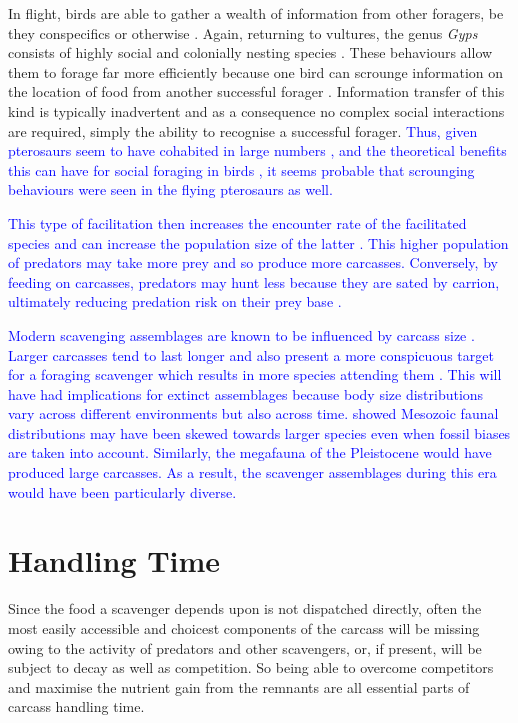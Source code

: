 \documentclass[a4paper,12pt]{article}
\begin{document}
In flight, birds are able to gather a wealth of information from other foragers, be they conspecifics or otherwise \textcolor{blue}{\citep{jackson2008effect,KaneVul,moleon2014inter}}.
Again, returning to vultures, the genus \textit{Gyps} consists of highly social and colonially nesting species \citep{fernandez2015density}.
These behaviours allow them to forage far more efficiently because one bird can scrounge information on the location of food from another successful forager \textcolor{blue}{\citep{cortes2014bird}}.
Information transfer of this kind is typically inadvertent and as a consequence no complex social interactions are required, simply the ability to recognise a successful forager.
\textcolor{blue}{Thus, given pterosaurs seem to have cohabited in large numbers \citep{witton2013pterosaurs}, and the theoretical benefits this can have for social foraging in birds \citep{jackson2011evolutionary}, it seems probable that scrounging behaviours were seen in the flying pterosaurs as well.} 

\textcolor{blue}{This type of facilitation then increases the encounter rate of the facilitated species and can increase the population size of the latter \citep{moleon2014inter}. 
This higher population of predators may take more prey and so produce more carcasses.
Conversely, by feeding on carcasses, predators may hunt less because they are sated by carrion, ultimately reducing predation risk on their prey base \citep{moleon2014inter}.} 

\textcolor{blue}{Modern scavenging assemblages are known to be influenced by carcass size \citep{moleon2015carcass}. 
Larger carcasses tend to last longer and also present a more conspicuous target for a foraging scavenger which results in more species attending them \citep{moleon2015carcass}.
This will have had implications for extinct assemblages because body size distributions vary across different environments but also across time. 
\cite{10.1371/journal.pone.0051925} showed Mesozoic faunal distributions may have been skewed towards larger species even when fossil biases are taken into account. 
Similarly, the megafauna of the Pleistocene \citep{doughty2013legacy} would have produced large carcasses. 
As a result, the scavenger assemblages during this era would have been particularly diverse.}

\section{Handling Time}
\label{handlingTime}
Since the food a scavenger depends upon is not dispatched directly, often the most easily accessible and choicest components of the carcass will be missing owing to the activity of predators and other scavengers, or, if present, will be subject to decay as well as competition.
So being able to overcome competitors and maximise the nutrient gain from the remnants are all essential parts of carcass handling time. 
\end{document}
